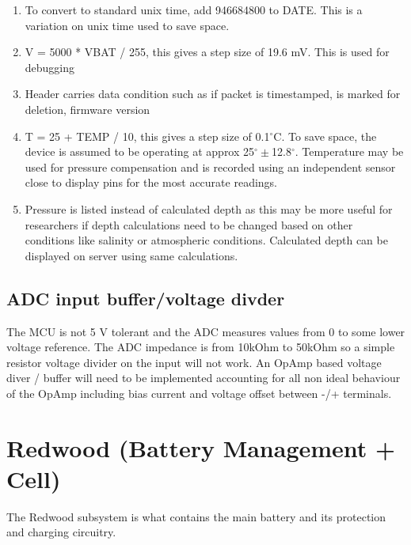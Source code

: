 \documentclass{article}
\begin{document}
\begin{table}[H]
\begin{center}
\begin{tabular}{|c|c|c|c|c|c|}
\end{tabular}
\begin{enumerate}
    \item To convert to standard unix time, add 946684800 to DATE. This is a variation on unix time used to save space.
    \item V = 5000 * VBAT / 255, this gives a step size of 19.6 mV. This is used for debugging
    \item Header carries data condition such as if packet is timestamped, is marked for deletion, firmware version
    \item T = 25 + TEMP / 10, this gives a step size of 0.1$^\circ$C. To save space, the device is assumed to be operating at approx 25$^\circ \pm$12.8$^\circ$. Temperature may be used for pressure compensation and is recorded using an independent sensor close to display pins for the most accurate readings.
    \item Pressure is listed instead of calculated depth as this may be more useful for researchers if depth calculations need to be changed based on other conditions like salinity or atmospheric conditions. Calculated depth can be displayed on server using same calculations.
\end{enumerate}
\end{center}
\end{table}



\pagebreak


\subsection{ADC input buffer/voltage divder}
The MCU is not 5 V tolerant and the ADC measures values from 0 to some lower voltage reference. The ADC impedance is from 10kOhm to 50kOhm so a simple resistor voltage divider on the input will not work. An OpAmp based voltage diver / buffer will need to be implemented accounting for all non ideal behaviour of the OpAmp including bias current and voltage offset between -/+ terminals.










\section{Redwood (Battery Management + Cell)}
The Redwood subsystem is what contains the main battery and its protection and charging circuitry.
\end{document}
